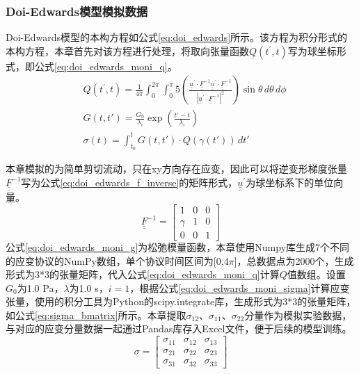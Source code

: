 \subsubsection{Doi-Edwards模型模拟数据}
Doi-Edwards模型的本构方程如公式\eqref{eq:doi_edwards}所示。该方程为积分形式的本构方程，本章首先对该方程进行处理，将取向张量函数$\underline{Q}(t^{\prime},t)$写为球坐标形式，即公式\eqref{eq:doi_edwards_moni_q}。
\begin{align}
   & Q(t^{\prime},t) = \frac{1}{4\pi} \int_{0}^{2\pi} \int_{0}^{\pi} 5 \left( \frac{\underline{\underline{u}}^{\prime} \cdot \underline{\underline{F}}^{-1} \underline{\underline{u}}^{\prime} \cdot \underline{\underline{F}}^{-1}}{|\underline{\underline{u}}^{\prime} \cdot \underline{\underline{F}}^{-1}|^{2}} \right) \sin\theta \, d\theta \, d\phi   \label{eq:doi_edwards_moni_q} \\
   & G(t, t') = \frac{G_0}{\lambda_i} \exp\left( \frac{t' - t}{\lambda_i} \right)   \label{eq:doi_edwards_moni_g}                                                                                                                                                                                                                                                                          \\
   & \sigma(t) = \int_{t_0}^t G(t, t') \cdot Q(\gamma(t')) \, dt' \label{eq:doi_edwards_moni_sigma}
\end{align}

本章模拟的为简单剪切流动，只在xy方向存在应变，因此可以将逆变形梯度张量$\underline{\underline{F}}^{-1}$写为公式\eqref{eq:doi_edwards_f_inverse}的矩阵形式，$\underline{\underline{u}}^{\prime}$为球坐标系下的单位向量。
\begin{equation}
  \underline{\underline{F}}^{-1} = \begin{bmatrix}
    1      & 0 & 0 \\
    \gamma & 1 & 0 \\
    0      & 0 & 1
  \end{bmatrix} \label{eq:doi_edwards_f_inverse}
\end{equation}
公式\eqref{eq:doi_edwards_moni_g}为松弛模量函数，本章使用Numpy库生成7个不同的应变协议的NumPy数组，单个协议时间区间为[0,4$\pi$]，总数据点为2000个，生成形式为3*3的张量矩阵，代入公式\eqref{eq:doi_edwards_moni_q}计算$Q$值数组。设置$G_0$为1.0 Pa，$\lambda$为1.0 s，$i=1$，根据公式\eqref{eq:doi_edwards_moni_sigma}计算应变张量，使用的积分工具为Python的scipy.integrate库，生成形式为3*3的张量矩阵，如公式\eqref{eq:sigma_bmatrix}所示。本章提取$
  \sigma_{12}$、$\sigma_{11}$、$\sigma_{22}$分量作为模拟实验数据，与对应的应变分量数据一起通过Pandas库存入Excel文件，便于后续的模型训练。
\begin{equation}
  \sigma = \begin{bmatrix}
    \sigma_{11} & \sigma_{12} & \sigma_{13} \\
    \sigma_{21} & \sigma_{22} & \sigma_{23} \\
    \sigma_{31} & \sigma_{32} & \sigma_{33}
  \end{bmatrix} \label{eq:sigma_bmatrix}
\end{equation}

